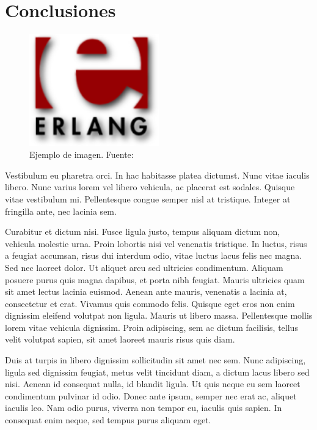 \chapter{Conclusiones}

  \begin{figure}[p]
	  \centering
	  \includegraphics[width=0.5\textwidth]{images/erlang-logo.png}
	  \caption[Ejemplo de imagen]{Ejemplo de imagen. Fuente: 
\cite{erlang01}}
	  \label{fig:imageexample}
  \end{figure}
  
  Vestibulum eu pharetra orci. In hac habitasse platea dictumst. Nunc vitae 
iaculis libero. Nunc varius lorem vel libero vehicula, ac placerat est sodales. 
Quisque vitae vestibulum mi. Pellentesque congue semper nisl at tristique. 
Integer at fringilla ante, nec lacinia sem.

Curabitur et dictum nisi. Fusce ligula justo, tempus aliquam dictum non, 
vehicula molestie urna. Proin lobortis nisi vel venenatis tristique. In luctus, 
risus a feugiat accumsan, risus dui interdum odio, vitae luctus lacus felis nec 
magna. Sed nec laoreet dolor. Ut aliquet arcu sed ultricies condimentum. Aliquam 
posuere purus quis magna dapibus, et porta nibh feugiat. Mauris ultricies quam 
sit amet lectus lacinia euismod. Aenean ante mauris, venenatis a lacinia at, 
consectetur et erat. Vivamus quis commodo felis. Quisque eget eros non enim 
dignissim eleifend volutpat non ligula. Mauris ut libero massa. Pellentesque 
mollis lorem vitae vehicula dignissim. Proin adipiscing, sem ac dictum 
facilisis, tellus velit volutpat sapien, sit amet laoreet mauris risus quis 
diam.

Duis at turpis in libero dignissim sollicitudin sit amet nec sem. Nunc 
adipiscing, ligula sed dignissim feugiat, metus velit tincidunt diam, a dictum 
lacus libero sed nisi. Aenean id consequat nulla, id blandit ligula. Ut quis 
neque eu sem laoreet condimentum pulvinar id odio. Donec ante ipsum, semper nec 
erat ac, aliquet iaculis leo. Nam odio purus, viverra non tempor eu, iaculis 
quis sapien. In consequat enim neque, sed tempus purus aliquam eget.

